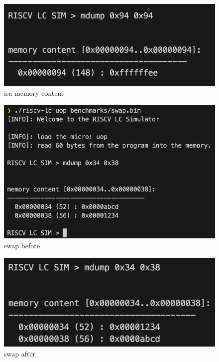 \documentclass[12pt, a4paper]{article}
\begin{document}
\begin{ans}
    \begin{figure}[H]
        \caption{isa memory content}
        \includegraphics[width=1\linewidth]{../figs/isa-mdump.png}
    \end{figure}
    
    \begin{figure}[H]
        \caption{swap before}
        \includegraphics[width=1\linewidth]{../figs/swap-before-1.png}
    \end{figure}
    \begin{figure}[H]
        \caption{swap after}
        \includegraphics[width=1\linewidth]{../figs/swap-after-1.png}
    \end{figure}
\end{ans}
\pagebreak
\end{document}
